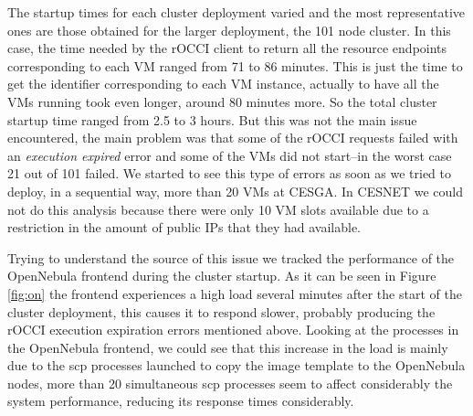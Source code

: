 \documentclass[oribibl]{llncs_Ibergrid2013}
\begin{document}
The startup times for each cluster deployment varied and the most representative ones are those obtained for the larger deployment, the 101 node cluster. In this case, the time needed by the rOCCI client to return all the resource endpoints corresponding to each VM ranged from 71 to 86 minutes. This is just the time to get the identifier corresponding to each VM instance, actually to have all the VMs running took even longer, around 80 minutes more. So the total cluster startup time ranged from 2.5 to 3 hours. But this was not the main issue encountered, the main problem was that some of the rOCCI requests failed with an \emph{execution expired} error and some of the VMs did not start--in the worst case 21 out of 101 failed.
We started to see this type of errors as soon as we tried to deploy, in a sequential way, more than 20 VMs at CESGA. In CESNET we could not do this analysis because there were only 10 VM slots available due to a restriction in the amount of public IPs that they had available.

Trying to understand the source of this issue we tracked the performance of the OpenNebula frontend during the cluster startup. As it can be seen in Figure \ref{fig:on} the frontend experiences a high load several minutes after the start of the cluster deployment, this causes it to respond slower, probably producing the rOCCI execution expiration errors mentioned above. Looking at the processes in the OpenNebula frontend, we could see that this increase in the load is mainly due to the scp processes launched to copy the image template to the OpenNebula nodes, more than 20 simultaneous scp processes seem to affect considerably the system performance, reducing its response times considerably.

%
%
%
%
\end{document}
